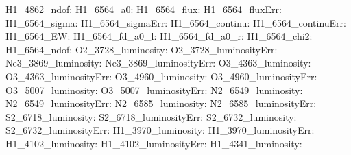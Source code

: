 H1\_4862\_ndof:  \newline 
H1\_6564\_a0:  \newline 
H1\_6564\_flux:  \newline 
H1\_6564\_fluxErr:  \newline 
H1\_6564\_sigma:  \newline 
H1\_6564\_sigmaErr:  \newline 
H1\_6564\_continu:  \newline 
H1\_6564\_continuErr:  \newline 
H1\_6564\_EW:  \newline 
H1\_6564\_fd\_a0\_l:  \newline 
H1\_6564\_fd\_a0\_r:  \newline 
H1\_6564\_chi2:  \newline 
H1\_6564\_ndof:  \newline 
O2\_3728\_luminosity:  \newline 
O2\_3728\_luminosityErr:  \newline 
Ne3\_3869\_luminosity:  \newline 
Ne3\_3869\_luminosityErr:  \newline 
O3\_4363\_luminosity:  \newline 
O3\_4363\_luminosityErr:  \newline 
O3\_4960\_luminosity:  \newline 
O3\_4960\_luminosityErr:  \newline 
O3\_5007\_luminosity:  \newline 
O3\_5007\_luminosityErr:  \newline 
N2\_6549\_luminosity:  \newline 
N2\_6549\_luminosityErr:  \newline 
N2\_6585\_luminosity:  \newline 
N2\_6585\_luminosityErr:  \newline 
S2\_6718\_luminosity:  \newline 
S2\_6718\_luminosityErr:  \newline 
S2\_6732\_luminosity:  \newline 
S2\_6732\_luminosityErr:  \newline 
H1\_3970\_luminosity:  \newline 
H1\_3970\_luminosityErr:  \newline 
H1\_4102\_luminosity:  \newline 
H1\_4102\_luminosityErr:  \newline 
H1\_4341\_luminosity:  \newline 
